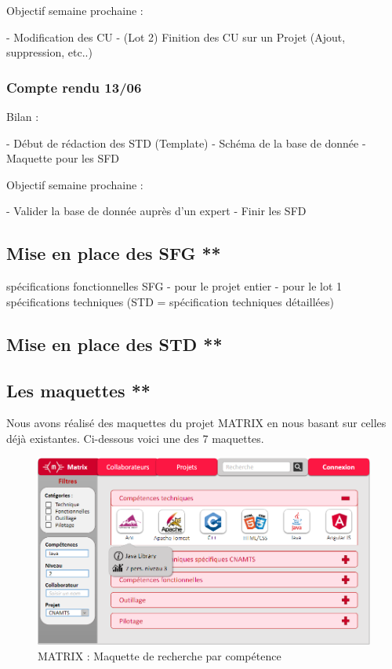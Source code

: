 Objectif semaine prochaine :

- Modification des CU
- (Lot 2) Finition des CU sur un Projet (Ajout, suppression, etc..)

\subsubsection{Compte rendu 13/06 }

Bilan :

- Début de rédaction des STD (Template)
- Schéma de la base de donnée
- Maquette pour les SFD

Objectif semaine prochaine :

- Valider la base de donnée auprès d'un expert
- Finir les SFD

\subsection{Mise en place des SFG **}

spécifications fonctionnelles SFG
    - pour le projet entier
    - pour le lot 1
spécifications techniques (STD = spécification techniques détaillées)

\subsection{Mise en place des STD **}

\subsection{Les maquettes **}

Nous avons réalisé des maquettes du projet MATRIX en nous basant sur celles déjà existantes. Ci-dessous voici une des 7 maquettes.

\begin{figure}[!h]
\centering
\includegraphics[width=1\textwidth]{images/matrix-maquette.png}
\caption{MATRIX : Maquette de recherche par compétence}
\end{figure}

